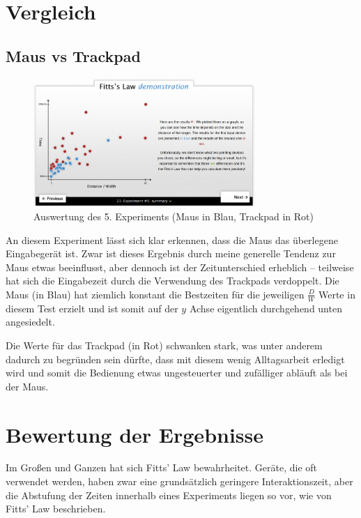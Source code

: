 \documentclass{article}
\begin{document}
\section{Vergleich}

\subsection{Maus vs Trackpad}

\begin{figure}[h!]
	\centering
	\includegraphics[width=0.75\textwidth]{experiment-5-maus-vs-trackpad}
	\caption{Auswertung des 5. Experiments (Maus in Blau, Trackpad in Rot)}
\end{figure}

An diesem Experiment lässt sich klar erkennen, dass die Maus das überlegene
Eingabegerät ist. Zwar ist dieses Ergebnis durch meine generelle Tendenz zur
Maus etwas beeinflusst, aber dennoch ist der Zeitunterschied erheblich –
teilweise hat sich die Eingabezeit durch die Verwendung des Trackpads
verdoppelt. Die Maus (in Blau) hat ziemlich konstant die Bestzeiten für die
jeweiligen $\frac{D}{W}$ Werte in diesem Test erzielt und ist somit auf der $y$
Achse eigentlich durchgehend unten angesiedelt.

Die Werte für das Trackpad (in Rot) schwanken stark, was unter anderem dadurch
zu begründen sein dürfte, dass mit diesem wenig Alltagsarbeit erledigt wird
und somit die Bedienung etwas ungesteuerter und zufälliger abläuft als bei der
Maus.

\section{Bewertung der Ergebnisse}

Im Großen und Ganzen hat sich Fitts' Law bewahrheitet. Geräte, die oft verwendet
werden, haben zwar eine grundsätzlich geringere Interaktionszeit, aber die
Abstufung der Zeiten innerhalb eines Experiments liegen so vor, wie von Fitts'
Law beschrieben.
\end{document}
